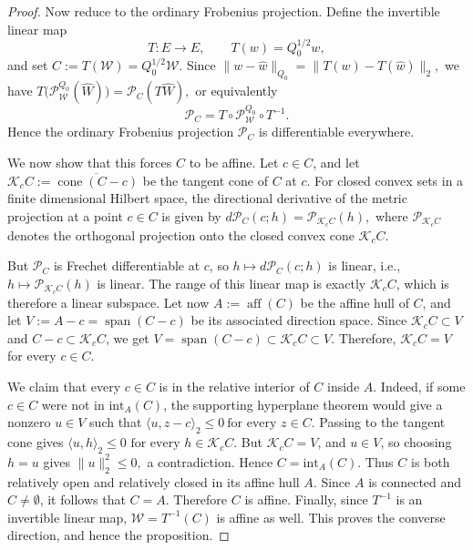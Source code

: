 \documentclass[10pt,a4paper]{amsart}
\begin{document}
\begin{proof}
Now reduce to the ordinary Frobenius projection. Define the invertible linear
map
\[
T:E\to E,\qquad T(w)=Q_0^{1/2}w,
\]
and set $C:=T(\mathscr W)=Q_0^{1/2}\mathscr W .$
Since 
$\|w-\widehat w\|_{Q_0} =
\|T(w)-T(\widehat w)\|_2,$
we have $
T\bigl(\mathcal P_{\mathscr W}^{Q_0}(\widehat W)\bigr) =
\mathcal P_C(T\widehat W),$
or equivalently
\[
\mathcal P_C
=
T\circ \mathcal P_{\mathscr W}^{Q_0}\circ T^{-1}.
\]
Hence the ordinary Frobenius projection \(\mathcal P_C\) is differentiable
everywhere.

We now show that this forces \(C\) to be affine. Let \(c\in C\), and let $
\mathcal K_cC:=\overline{\operatorname{cone}(C-c)}
$
be the tangent cone of \(C\) at \(c\). For closed convex sets in a finite
dimensional Hilbert space, the directional derivative of the metric projection
at a point \(c\in C\) is given by $d\mathcal P_C(c;h)=\mathcal P_{\mathcal K_cC}(h),$
where \(\mathcal P_{\mathcal K_cC}\) denotes the orthogonal projection onto the closed
convex cone \(\mathcal K_cC\).

But \(\mathcal P_C\) is Frechet differentiable at \(c\), so
$h\mapsto d\mathcal P_C(c;h)$
is linear, i.e., \(h\mapsto \mathcal P_{\mathcal K_cC}(h)\) is linear. The range of
this linear map is exactly \(\mathcal K_cC\), which is therefore a linear subspace.
Let now $A:=\operatorname{aff}(C)$
be the affine hull of \(C\), and let $
V:=A-c=\operatorname{span}(C-c)
$
be its associated direction space. Since \(\mathcal K_cC\subset V\) and
\(C-c\subset \mathcal K_cC\), we get
$
V=\operatorname{span}(C-c)\subset \mathcal K_cC\subset V.
$
Therefore, $
\mathcal K_cC=V
$
for every \(c\in C\).

We claim that every \(c\in C\) is in the relative interior of \(C\) inside
\(A\). Indeed, if some \(c\in C\) were not in \(\mathrm{int}_A(C)\), the
supporting hyperplane theorem would give a nonzero \(u\in V\) such that $\langle u,z-c\rangle_2\le 0\  
  \text{for every }z\in C
$. Passing to the tangent cone gives
$
\langle u,h\rangle_2\le 0\,\,
 \text{for every }h\in \mathcal K_cC.
$
But \(\mathcal K_cC=V\), and \(u\in V\), so choosing \(h=u\) gives $
\|u\|_2^2\le0,
$
a contradiction. Hence \(C=\mathrm{int}_A(C)\).
Thus \(C\) is both relatively open and relatively closed in its affine hull
\(A\). Since \(A\) is connected and \(C\neq\emptyset\), it follows that $
C=A.
$
Therefore \(C\) is affine. Finally, since \(T^{-1}\) is an invertible linear map, $
\mathscr W=T^{-1}(C)
$
is affine as well.
This proves the converse direction, and hence the proposition.
\end{proof}
\end{document}

